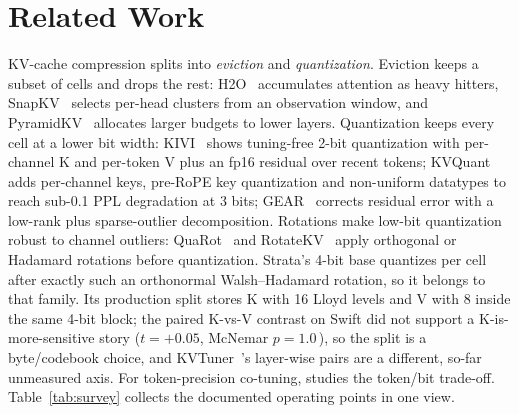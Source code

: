 \documentclass[10pt,twocolumn]{article}
\begin{document}
\section{Related Work}\label{sec:related}

KV-cache compression splits into \emph{eviction} and \emph{quantization}.
Eviction keeps a subset of cells and drops the rest: H2O~\cite{h2o} accumulates attention as heavy hitters, SnapKV~\cite{snapkv} selects per-head clusters from an observation window, and PyramidKV~\cite{pyramidkv} allocates larger budgets to lower layers. Quantization keeps every cell at a lower bit width: KIVI~\cite{kivi} shows tuning-free 2-bit quantization with per-channel K and per-token V plus an fp16 residual over recent tokens; KVQuant~\cite{kvquant} adds per-channel keys, pre-RoPE key quantization and non-uniform datatypes to reach sub-0.1 PPL degradation at 3 bits; GEAR~\cite{gear} corrects residual error with a low-rank plus sparse-outlier decomposition. Rotations make low-bit quantization robust to channel outliers: QuaRot~\cite{quarot} and RotateKV~\cite{rotatekv} apply orthogonal or Hadamard rotations before quantization. Strata's 4-bit base quantizes per cell after exactly such an orthonormal Walsh--Hadamard rotation, so it belongs to that family. Its production split stores K with 16 Lloyd levels and V with 8 inside the same 4-bit block; the paired K-vs-V contrast on Swift did not support a K-is-more-sensitive story ($t{=}{+}0.05$, McNemar $p{=}1.0$\,\cite{strata-wp}), so the split is a byte/codebook choice, and KVTuner~\cite{kvtuner}'s layer-wise pairs are a different, so-far unmeasured axis. For token-precision co-tuning, \cite{top-k} studies the token/bit trade-off. Table~\ref{tab:survey} collects the documented operating points in one view.
\end{document}
